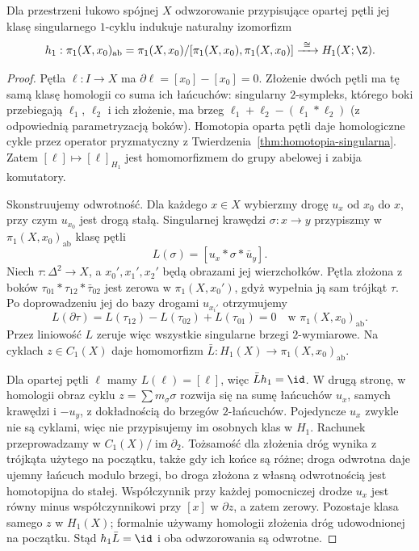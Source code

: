 \begin{twierdzenie}
\label{thm:hurewicz-h1}
Dla przestrzeni łukowo spójnej $X$
odwzorowanie przypisujące opartej pętli
jej klasę singularnego
$1$-cyklu indukuje naturalny
izomorfizm
\[
 h_1:\pi_1(X,x_0)_{\mathrm{ab}}
 =\pi_1(X,x_0)/
 [\pi_1(X,x_0),\pi_1(X,x_0)]
 \xrightarrow{\ \cong\ }H_1(X;\Z).
\]
\end{twierdzenie}
\begin{proof}
Pętla $\ell:I\to X$ ma
$\partial\ell=[x_0]-[x_0]=0$.
Złożenie dwóch pętli
ma tę samą klasę homologii
co suma ich łańcuchów:
singularny $2$-sympleks, którego boki
przebiegają $\ell_1$, $\ell_2$ i ich złożenie, ma
brzeg $\ell_1+\ell_2-
(\ell_1*\ell_2)$
(z odpowiednią
parametryzacją boków).
Homotopia oparta pętli daje homologiczne cykle przez operator pryzmatyczny
z Twierdzenia~\ref{thm:homotopia-singularna}.
Zatem $[\ell]\mapsto
[\ell]_{H_1}$ jest
homomorfizmem do grupy
abelowej i zabija komutatory.

Skonstruujemy odwrotność.
Dla każdego $x\in X$
wybierzmy drogę $u_x$
od $x_0$ do $x$,
przy czym $u_{x_0}$
jest drogą stałą.
Singularnej krawędzi
$\sigma:x\to y$
przypiszmy w
$\pi_1(X,x_0)_{\mathrm{ab}}$
klasę pętli
\[
 L(\sigma)
 =[u_x*\sigma*\bar u_y].
\]
Niech $\tau:\Delta^2\to X$,
a $x_0',x_1',x_2'$
będą obrazami jej
wierzchołków.
Pętla złożona z boków
$\tau_{01}*\tau_{12}*
\bar\tau_{02}$ jest
zerowa w $\pi_1(X,x_0')$,
gdyż wypełnia ją
sam trójkąt $\tau$.
Po doprowadzeniu jej
do bazy drogami $u_{x_i'}$
otrzymujemy
\[
 L(\partial\tau)
 =L(\tau_{12})-L(\tau_{02})
  +L(\tau_{01})=0
 \quad\text{w }\pi_1(X,x_0)_{\mathrm{ab}}.
\]
Przez liniowość $L$
zeruje więc wszystkie
singularne brzegi
$2$-wymiarowe.
Na cyklach $z\in C_1(X)$
daje homomorfizm
$\bar L:H_1(X)\to
\pi_1(X,x_0)_{\mathrm{ab}}$.

Dla opartej pętli
$\ell$ mamy $L(\ell)=[\ell]$,
więc $\bar Lh_1=\id$.
W drugą stronę,
w homologii
obraz cyklu
$z=\sum m_\sigma\sigma$
rozwija się na
sumę łańcuchów $u_x$, samych krawędzi i $-u_y$,
z dokładnością do brzegów $2$-łańcuchów.
Pojedyncze $u_x$ zwykle nie są cyklami, więc nie przypisujemy
im osobnych klas w $H_1$. Rachunek przeprowadzamy w $C_1(X)/\operatorname{im}\partial_2$.
Tożsamość dla złożenia dróg wynika z trójkąta użytego na początku,
także gdy ich końce są różne; droga odwrotna daje ujemny łańcuch
modulo brzegi, bo droga złożona z własną odwrotnością jest homotopijna do stałej.
Współczynnik przy
każdej pomocniczej
drodze $u_x$ jest
równy minus współczynnikowi
przy $[x]$ w $\partial z$,
a zatem zerowy.
Pozostaje klasa
samego $z$ w $H_1(X)$;
formalnie używamy
homologii złożenia
dróg udowodnionej
na początku. Stąd
$h_1\bar L=\id$
i oba odwzorowania są
odwrotne.
\end{proof}

